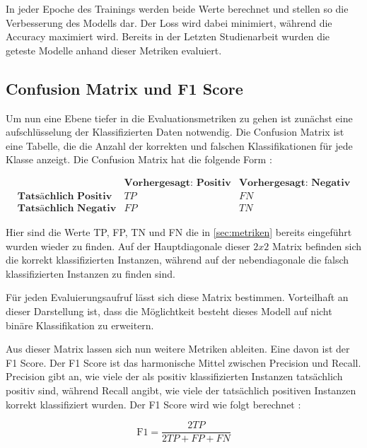 In jeder Epoche des Trainings werden beide Werte berechnet und stellen so die Verbesserung des Modells dar. Der Loss wird dabei minimiert, während die Accuracy maximiert wird. Bereits in der Letzten Studienarbeit wurden die geteste Modelle anhand dieser Metriken evaluiert.

\subsection{Confusion Matrix und F1 Score} \label{sec:confusionmatrix}

Um nun eine Ebene tiefer in die Evaluationsmetriken zu gehen ist zunächst eine aufschlüsselung der Klassifizierten Daten notwendig. Die Confusion Matrix ist eine Tabelle, die die Anzahl der korrekten und falschen Klassifikationen für jede Klasse anzeigt. Die Confusion Matrix hat die folgende Form \cite{lipton_thresholding_2014}:

\[
\begin{array}{c|cc}
    & \textbf{Vorhergesagt: Positiv} & \textbf{Vorhergesagt: Negativ} \\
    \hline
    \textbf{Tatsächlich Positiv} & TP & FN \\
    \textbf{Tatsächlich Negativ} & FP & TN
\end{array}
\]

Hier sind die Werte TP, FP, TN und FN die in \autoref{sec:metriken} bereits eingeführt wurden wieder zu finden. Auf der Hauptdiagonale dieser $2x2$ Matrix befinden sich die korrekt klassifizierten Instanzen, während auf der nebendiagonale die falsch klassifizierten Instanzen zu finden sind. 

Für jeden Evaluierungsaufruf lässt sich diese Matrix bestimmen. Vorteilhaft an dieser Darstellung ist, dass die Möglichtkeit besteht dieses Modell auf nicht binäre Klassifikation zu erweitern. 

Aus dieser Matrix lassen sich nun weitere Metriken ableiten. Eine davon ist der F1 Score. Der F1 Score ist das harmonische Mittel zwischen Precision und Recall. Precision gibt an, wie viele der als positiv klassifizierten Instanzen tatsächlich positiv sind, während Recall angibt, wie viele der tatsächlich positiven Instanzen korrekt klassifiziert wurden. Der F1 Score wird wie folgt berechnet \cite{lipton_thresholding_2014}:

\begin{equation}
    \text{F1} = \frac{2 TP}{2 TP + FP + FN }
\end{equation}

